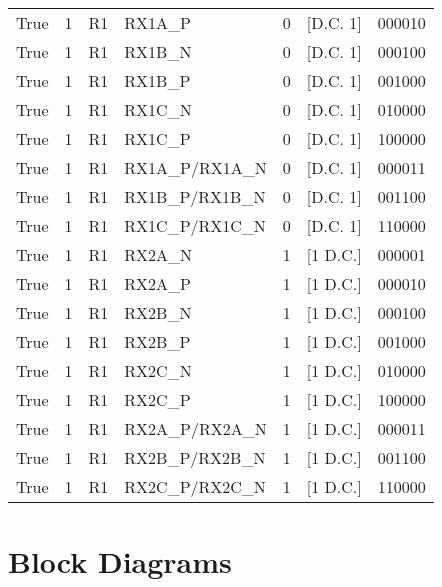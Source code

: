 \documentclass{article}
\begin{document}
\begin{landscape}
\begin{scriptsize}
\begin{longtable}{|p{4.5cm}|p{3.5cm}|p{1.5cm}|p{3.5cm}|p{1.75cm}|p{2.1cm}|p{2cm}|}
		True & 1 & R1 & RX1A\_P         & 0 & [D.C. 1]  & 000010 \\
		True & 1 & R1 & RX1B\_N         & 0 & [D.C. 1]  & 000100 \\
		True & 1 & R1 & RX1B\_P         & 0 & [D.C. 1]  & 001000 \\
		True & 1 & R1 & RX1C\_N         & 0 & [D.C. 1]  & 010000 \\
		True & 1 & R1 & RX1C\_P         & 0 & [D.C. 1]  & 100000 \\
		True & 1 & R1 & RX1A\_P/RX1A\_N & 0 & [D.C. 1]  & 000011 \\
		True & 1 & R1 & RX1B\_P/RX1B\_N & 0 & [D.C. 1]  & 001100 \\
		True & 1 & R1 & RX1C\_P/RX1C\_N & 0 & [D.C. 1]  & 110000 \\
		\hline
		True & 1 & R1 & RX2A\_N         & 1 & [1 D.C.] & 000001 \\
		True & 1 & R1 & RX2A\_P         & 1 & [1 D.C.] & 000010 \\
		True & 1 & R1 & RX2B\_N         & 1 & [1 D.C.] & 000100 \\
		True & 1 & R1 & RX2B\_P         & 1 & [1 D.C.] & 001000 \\
		True & 1 & R1 & RX2C\_N         & 1 & [1 D.C.] & 010000 \\
		True & 1 & R1 & RX2C\_P         & 1 & [1 D.C.] & 100000 \\
		True & 1 & R1 & RX2A\_P/RX2A\_N & 1 & [1 D.C.] & 000011 \\
		True & 1 & R1 & RX2B\_P/RX2B\_N & 1 & [1 D.C.] & 001100 \\
		True & 1 & R1 & RX2C\_P/RX2C\_N & 1 & [1 D.C.] & 110000 \\
		\hline
	\end{longtable}

\end{scriptsize}
\end{landscape}

\section*{Block Diagrams}
\end{document}
